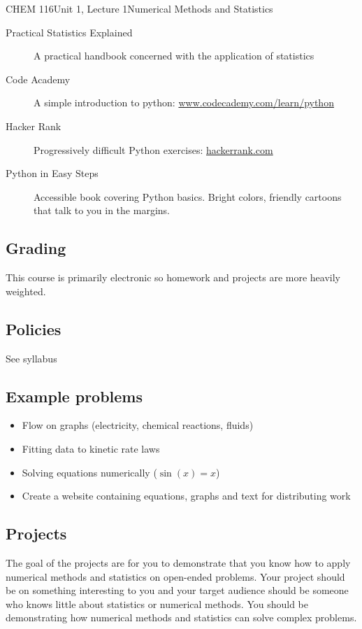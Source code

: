 \documentclass{article}
\begin{document}
\begin{tdoc}{CHEM 116}{Unit 1, Lecture 1}{Numerical Methods and Statistics}
\begin{description}
\item[Practical Statistics Explained]{A practical handbook concerned with the application of statistics}

\item[Code Academy]{A simple introduction to python: \href{https://www.codecademy.com/learn/python}{www.codecademy.com/learn/python}}

\item[Hacker Rank]{Progressively difficult Python exercises: \href{https://www.hackerrank.com}{hackerrank.com}}

\item[Python in Easy Steps]{Accessible book covering Python basics. Bright colors, friendly cartoons that talk to you in the margins.}

\end{description}

\subsection{Grading}

This course is primarily electronic so homework and projects are more
heavily weighted.

\subsection{Policies}
See syllabus

\subsection{Example problems}

\begin{itemize}

\item Flow on graphs (electricity, chemical reactions, fluids)
\item Fitting data to kinetic rate laws
\item Solving equations numerically ($\sin(x) = x$)
\item Create a website containing equations, graphs and text for distributing work

\end{itemize}

\subsection{Projects}

The goal of the projects are for you to demonstrate that you know how to apply numerical methods and statistics on open-ended problems. Your project should be on something interesting to you and your target audience should be someone who knows little about statistics or numerical methods. You should be demonstrating how numerical methods and statistics can solve complex problems.


\end{tdoc}
\end{document}
